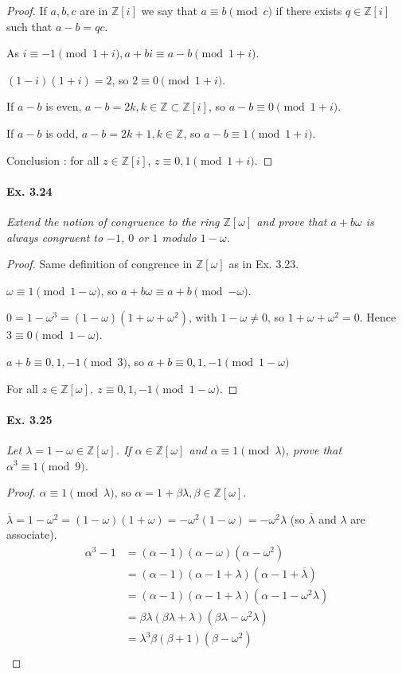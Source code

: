 \documentclass[11pt,a4paper]{article}
\newcommand{\Z}{\mathbb{Z}}
\begin{document}
{\begin{proof}
If $a,b,c$ are in $\Z[i]$ we say that $a\equiv b \pmod c$ if there exists $q \in \Z[i]$ such that $a-b = qc$.

As $i\equiv -1 \pmod{1+i}, a+bi \equiv a-b \pmod {1+i}$.

$(1-i)(1+i) = 2$, so $2\equiv 0 \pmod{1+i}$.

If $a-b$ is even, $a-b =2k,k\in \Z \subset \Z[i]$, so $a-b \equiv 0 \pmod{1+i}$.

If $a-b$ is odd, $a-b = 2k+1, k \in \Z$, so $a-b \equiv 1 \pmod {1+i}$.

Conclusion : for all $z \in \Z[i]$, $z\equiv0,1 \pmod{1+i}$.
\end{proof}

\paragraph{Ex. 3.24}

{\it Extend the notion of congruence to the ring $\Z[\omega]$ and prove that $a + b\omega$ is always congruent to $-1$, $0$ or $1$ modulo $1 - \omega$.
}

\begin{proof}
Same definition of congrence in $\Z[\omega]$ as in Ex. 3.23.

$\omega \equiv 1 \pmod{1-\omega}$, so $a+b\omega \equiv a+b \pmod{-\omega}$.

$0 = 1-\omega^3 = (1- \omega)(1+\omega+\omega^2)$, with $1-\omega \neq 0$, so  $1+\omega+\omega^2 = 0$. Hence $3 \equiv 0 \pmod{1-\omega}$.

$a+b \equiv 0,1,-1 \pmod 3$, so $a+b \equiv 0,1,-1 \pmod {1-\omega}$

For all $z \in \Z[\omega],\  z \equiv 0,1,-1 \pmod{1-\omega}$.
\end{proof}

\paragraph{Ex. 3.25} 

{\it Let $\lambda = 1 -\omega \in \Z[\omega]$. If $\alpha \in \Z[\omega]$ and $\alpha \equiv 1 \pmod \lambda$, prove that $\alpha^3 \equiv 1 \pmod 9$.
}

\begin{proof} 
$\alpha \equiv 1 \pmod \lambda$, so $\alpha = 1 + \beta \lambda, \beta \in \Z[\omega]$.

$\overline{\lambda} = 1 - \omega^2 = (1-\omega)(1+\omega) = -\omega^2(1-\omega) = -\omega^2 \lambda$ (so $\overline{\lambda}$ and $\lambda$ are associate).
\begin{align*}
\alpha^3-1&=(\alpha-1)(\alpha-\omega)(\alpha-\omega^2)\\
&=(\alpha-1)(\alpha-1+\lambda)(\alpha-1+\overline{\lambda})\\
&=(\alpha-1)(\alpha-1+\lambda)(\alpha-1-\omega^2\lambda)\\
&=\beta \lambda (\beta\lambda + \lambda) (\beta \lambda - \omega^2\lambda)\\
&=\lambda^3 \beta (\beta+1)(\beta-\omega^2)\\
\end{align*}


\end{proof}}
\end{document}
